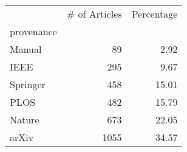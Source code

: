 \begin{tabular}{lrr}
\toprule
{} &  \# of Articles &  Percentage \\
provenance &                &             \\
\midrule
Manual     &             89 &        2.92 \\
IEEE       &            295 &        9.67 \\
Springer   &            458 &       15.01 \\
PLOS       &            482 &       15.79 \\
Nature     &            673 &       22.05 \\
arXiv      &           1055 &       34.57 \\
\bottomrule
\end{tabular}
